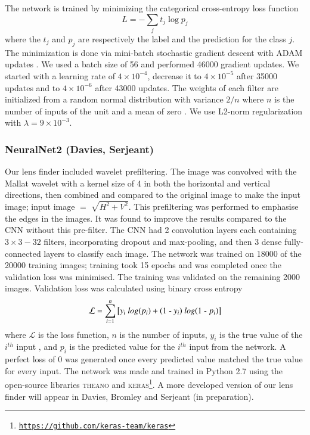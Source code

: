 \documentclass{aa}
\begin{document}
The network is trained by minimizing the categorical cross-entropy loss function
\begin{equation}
L = -\sum_j t_{j}\log p_{j}
\label{EQloss}
\end{equation}
where the $t_j$ and $p_j$ are respectively the label and the prediction for the class $j$. 
The minimization is done via mini-batch stochastic gradient descent with ADAM updates \citep{Kingma_2014}. We used a batch size of 56 and performed  46000 gradient updates. We started with a learning rate of $4 \times 10^{-4}$, decrease it to $4 \times 10^{-5}$ after 35000 updates and to $4 \times 10^{-6}$ after 43000 updates.
The weights of each filter are initialized from a random normal distribution with variance ${2/n}$ where $n$ is the number of inputs of the unit  and a mean of zero \citep{He2015a}.  
We use L2-norm regularization with $\lambda= 9 \times 10^{-3}$.

\subsubsection{NeuralNet2 (Davies, Serjeant) }
\label{sec:NeuralNet2}

Our lens finder included wavelet prefiltering. The image was convolved with the Mallat wavelet with a kernel size of 4 in both the horizontal and vertical directions, then combined and compared to the original image to make the input image;  input image $= \sqrt[]{H^{2}+V^{2}}$. This prefiltering was performed to emphasise the edges in the images. It was found to improve the results compared to the CNN without this pre-filter. The CNN had 2 convolution layers each containing  $3\times3 - 32$ filters, incorporating dropout and max-pooling, and then 3 dense fully-connected layers to classify each image. The network was trained on 18000 of the 20000 training images; training took 15 epochs and was completed once the validation loss was minimised. The training was validated on the remaining 2000 images. Validation loss was calculated using binary cross entropy
\begin{equation}
\mathcal{L} = \sum_{i=1}^{n} \big[ y_{i}$ $log(p_{i}) + (1 $ - $ y_{i})$ $log(1 $ - $ p_{i}) \big]
\end{equation} where $\mathcal{L}$ is the loss function, $n$ is the number of inputs, $y_{i}$ is the true value of the $i^{th}$ input , and $p_{i}$ is the predicted value for the $i^{th}$ input from the network. A perfect loss of $0$ was generated once every predicted value matched the true value for every input. The network was made and trained in Python 2.7 using the open-source libraries \textsc{theano} and \textsc{keras}\footnote{\href{https://github.com/keras-team/keras}{\tt https://github.com/keras-team/keras}}. A more developed version of our lens finder will appear in Davies, Bromley and Serjeant (in preparation).
\end{document}
